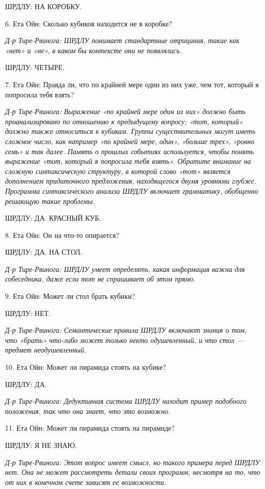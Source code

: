 \documentclass[../main.tex]{subfiles}
\begin{document}
\begin{dialogue}
ШРДЛУ: НА КОРОБКУ.

6. Ета Ойн: Сколько кубиков находится не в коробке?

\emph{Д-р Тире-Рвинога: ШРДЛУ понимает стандартные отрицания, такие как «нет» и «не», в каком бы контексте они не появлялись.}

ШРДЛУ: ЧЕТЫРЕ.

7. Ета Ойн: Правда ли, что по крайней мере один из них уже, чем тот, который я попросила тебя взять?

\emph{Д-р Тире-Рвинога: Выражение «по крайней мере один из них» должно быть проанализировано по отношению к предыдущему вопросу; «тот, который» должно также относиться к кубикам. Группы существительных могут иметь сложное число, как например «по крайней мере, один», «больше трех», «ровно семь» и так далее. Память о прошлых событиях используется, чтобы понять выражение «тот, который я попросила тебя взять». Обратите внимание на сложную синтаксическую структуру, в которой слово «тот» является дополнением придаточного предложения, находящегося двумя уровнями глубже. Программа синтаксического анализа ШРДЛУ включает грамматику, обобщенно решающую такие проблемы.}

ШРДЛУ: ДА. КРАСНЫЙ КУБ.

8. Ета Ойн: Он на что-то опирается?

ШРДЛУ: ДА. НА СТОЛ.

\emph{Д-р Тире-Рвинога: ШРДЛУ умеет определять, какая информация важна для собеседника, даже если тот не спрашивает об этом прямо.}

9. Ета Ойн: Может ли стол брать кубики?

ШРДЛУ: НЕТ.

\emph{Д-р Тире-Рвинога: Семантические правила ШРДЛУ включают знания о том, что «брать» что-либо может только некто одушевленный, и что стол --- предмет неодушевленный.}

10. Ета Ойн: Может ли пирамида стоять на кубике?

ШРДЛУ: ДА.

\emph{Д-р Тире-Рвинога: Дедуктивная система ШРДЛУ находит пример подобного положения, так что она знает, что это возможно.}

11. Ета Ойн: Может ли пирамида стоять на пирамиде?

ШРДЛУ: Я НЕ ЗНАЮ.

\emph{Д-р Тире-Рвинога: Этот вопрос имеет смысл, но такого примера перед ШРДЛУ нет. Она не может рассмотреть детали своих программ, несмотря на то, что от них в конечном счете зависят ее возможности.}


\end{dialogue}
\end{document}
